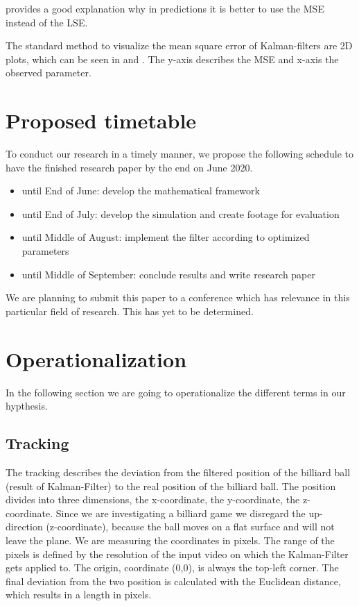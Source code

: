 \documentclass[titlepage, a4paper, 11pt]{scrartcl}
\begin{document}
        \cite{allen1971mean} provides a good explanation why in predictions it is better to use the MSE instead of the LSE.

        The standard method to visualize the mean square error of Kalman-filters are 2D plots,
        which can be seen in \cite{8993001} and \cite{1165091}. The y-axis describes the MSE and x-axis the observed parameter.     

    \section{Proposed timetable}

    To conduct our research in a timely manner, we propose the following schedule to have the finished research paper by the end on June 2020.

    \begin{itemize}
        \item until End of June: develop the mathematical framework
        \item until End of July: develop the simulation and create footage for evaluation
        \item until Middle of August: implement the filter according to optimized parameters
        \item until Middle of September: conclude results and write research paper
    \end{itemize}

    We are planning to submit this paper to a conference which has relevance in this particular field of research. This has yet to be determined.


    \section{Operationalization}

    In the following section we are going to operationalize the different terms in our hypthesis.

        \subsection{Tracking}

        The tracking describes the deviation from the filtered position of the billiard ball (result of Kalman-Filter) to the real position of the billiard ball.
        The position divides into three dimensions, the x-coordinate, the y-coordinate, the z-coordinate.
        Since we are investigating a billiard game we disregard the up-direction (z-coordinate), because the ball moves on a flat surface and will not leave the plane.
        We are measuring the coordinates in pixels. The range of the pixels is defined by the resolution of the input video on which the Kalman-Filter gets applied to.
        The origin, coordinate (0,0), is always the top-left corner.
        The final deviation from the two position is calculated with the Euclidean distance, which results in a length in pixels.
\end{document}
